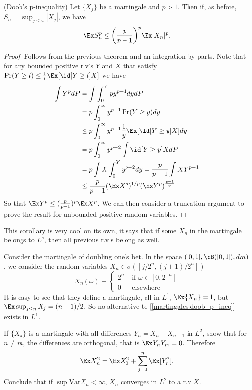 \begin{corollary}(Doob's p-inequality)
	\label{martingales:doob_p_ineq}
	Let $\{X_j\}$ be a martingale and $p > 1$. Then if, as before, $S_n
	= \sup_{j \leq n} |X_j|$, we have
	\[
		\Ex S_n^p \leq \bigg(\frac{p}{p-1}\bigg)^p\Ex |X_n|^p.
	\]
\end{corollary}
\begin{proof}
	Follows from the previous theorem and an integration by parts. Note
	that for any bounded positive r.v's $Y$ and $X$
	that satisfy $\Pr(Y \geq l) \leq \frac{1}{l}\Ex[\id[Y \geq l]X]$ we have
	\begin{align*}
		\int Y^p dP & = \int\int_0^Y py^{p-1} dy dP                                 \\
		& = p \int_0^\infty y^{p-1}\Pr(Y \geq y)dy                      \\
		& \leq p \int_0^\infty y^{p-1} \frac{1}{y}\Ex[\id[Y \geq y]X]dy \\
		& = p \int_0^\infty y^{p-2} \int \id[Y \geq y] X dP             \\
		& = p\int X \int_0^Y y^{p-2} dy = \frac{p}{p-1} \int X Y^{p-1}  \\
		& \leq \frac{p}{p-1}(\Ex X^p)^{1/p} (\Ex Y^p)^{\frac{p-1}{p}}
	\end{align*}
	So that $\Ex Y^p \leq (\frac{p}{p-1})^p \Ex X^p$. We can then
	consider a truncation argument to prove the result
	for unbounded positive random variables.
\end{proof}
\begin{remark}
	This corollary is very cool on its own, it says that if some $X_n$
	in the martingale belongs to $L^p$, then
	all previous r.v's belong as well.
\end{remark}

\begin{exercise}
	Consider the martingale of doubling one's bet. In the space $([0,1],
	\cB([0,1]), dm)$,
	we consider the random variables $X_n \in \sigma([j/2^n, (j+1)/2^n])$
	\[
		X_n(\omega) =
		\begin{cases}
			2^n & \text{ if } \omega \in [0,2^{-n}] \\
			0   & \text{ elsewhere}
		\end{cases}
	\]
	It is easy to see that they define a martingale, all in $L^1$,
	$\Ex{X_n} = 1$, but $\Ex \sup_{j \leq n} X_j = (n+1)/2$.
	So no alternative to [\ref{martingales:doob_p_ineq}] exists in $L^1$.
\end{exercise}

\begin{exercise}
	If $\{X_n\}$ is a martingale with all differences $Y_n = X_{n} -
	X_{n-1}$ in $L^2$, show that for $n \neq m$,
	the differences are orthogonal, that is $\Ex Y_nY_m = 0$. Therefore
	\[
		\Ex X_n^2 = \Ex X_0^2 + \sum_{j = 1}^n \Ex[Y_n^2].
	\]
	Conclude that if $\sup \mathrm{Var}X_n < \infty$, $X_n$ converges in
	$L^2$ to a r.v $X$.
\end{exercise}

